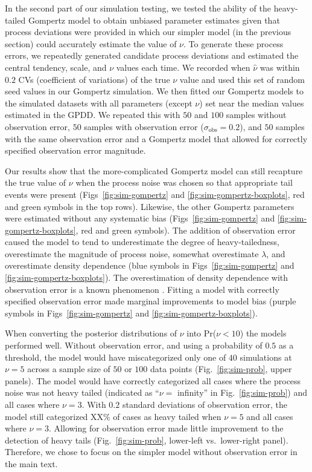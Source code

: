 In the second part of our simulation testing, we tested the ability of the heavy-tailed Gompertz model to obtain unbiased parameter estimates given that process deviations were provided in which our simpler model (in the previous section) could accurately estimate the value of $\nu$. To generate these process errors, we repeatedly generated candidate process deviations and estimated the central tendency, scale, and $\nu$ values each time. We recorded when $\hat{\nu}$ was within $0.2$ CVs (coefficient of variations) of the true $\nu$ value and used this set of random seed values in our Gompertz simulation. We then fitted our Gompertz models to the simulated datasets with all parameters (except $\nu$) set near the median values estimated in the GPDD. We repeated this with $50$ and $100$ samples without observation error, $50$ samples with observation error ($\sigma_\mathrm{obs} = 0.2$), and $50$ samples with the same observation error and a Gompertz model that allowed for correctly specified observation error magnitude.

Our results show that the more-complicated Gompertz model can still recapture the true value of $\nu$ when the process noise was chosen so that appropriate tail events were present (Figs~\ref{fig:sim-gompertz} and \ref{fig:sim-gompertz-boxplots}, red and green symbols in the top rows). Likewise, the other Gompertz parameters were estimated without any systematic bias (Figs~\ref{fig:sim-gompertz} and \ref{fig:sim-gompertz-boxplots}, red and green symbols). The addition of observation error caused the model to tend to underestimate the degree of heavy-tailedness, overestimate the magnitude of process noise, somewhat overestimate $\lambda$, and overestimate density dependence (blue symbols in Figs~\ref{fig:sim-gompertz} and \ref{fig:sim-gompertz-boxplots}). The overestimation of density dependence with observation error is a known phenomenon \citep{knape2012}. Fitting a model with correctly specified observation error made marginal improvements to model bias (purple symbols in Figs~\ref{fig:sim-gompertz} and \ref{fig:sim-gompertz-boxplots}). 

When converting the posterior distributions of $\nu$ into Pr($\nu < 10$) the models performed well. Without observation error, and using a probability of $0.5$ as a threshold, the model would have miscategorized only one of $40$ simulations at $\nu = 5$ across a sample size of $50$ or $100$ data points (Fig.~\ref{fig:sim-prob}, upper panels). The model would have correctly categorized all cases where the process noise was not heavy tailed (indicated as ``$\nu =$ infinity'' in Fig.~\ref{fig:sim-prob}) and all cases where $\nu = 3$. With $0.2$ standard deviations of observation error, the model still categorized XX\% of cases as heavy tailed when $\nu = 5$ and all cases where $\nu = 3$. Allowing for observation error made little improvement to the detection of heavy tails (Fig.~\ref{fig:sim-prob}, lower-left vs.\ lower-right panel). Therefore, we chose to focus on the simpler model without observation error in the main text.

